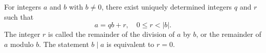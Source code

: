 For integers $a$ and $b$ with $b \neq 0$, there exist uniquely determined integers $q$ and $r$ such that
$$a = qb + r, \quad 0 \leq r < |b|.$$
The integer $r$ is called the remainder of the division of $a$ by $b$, or the remainder of $a$ modulo $b$. The statement $b \mid a$ is equivalent to $r = 0$.
